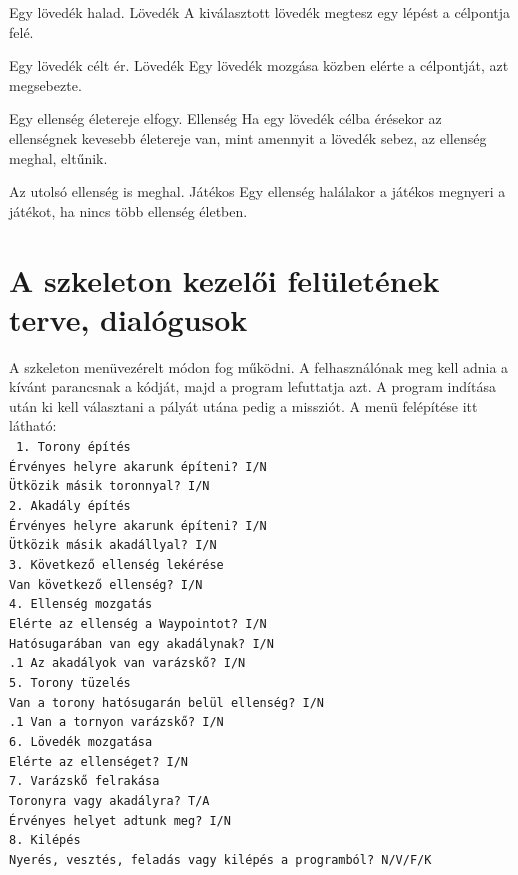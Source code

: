 {Egy lövedék halad.}
{Lövedék}
{A kiválasztott lövedék megtesz egy lépést a célpontja felé.}

{Egy lövedék célt ér.}
{Lövedék}
{Egy lövedék mozgása közben elérte a célpontját, azt megsebezte.}

{Egy ellenség életereje elfogy.}
{Ellenség}
{Ha egy lövedék célba érésekor az ellenségnek kevesebb életereje van, mint amennyit a lövedék sebez, az ellenség meghal, eltűnik.}

{Az utolsó ellenség is meghal.}
{Játékos}
{Egy ellenség halálakor a játékos megnyeri a játékot, ha nincs több ellenség életben.}

\pagebreak
\setlength\parindent{15mm}
\section{A szkeleton kezelői felületének terve, dialógusok}
A szkeleton menüvezérelt módon fog működni. A felhasználónak meg kell adnia a kívánt parancsnak a kódját, majd a program lefuttatja azt. A program indítása után ki kell választani a pályát utána pedig a missziót. A menü felépítése itt látható: \\
\begingroup 
\fontsize{10pt}{10pt}\selectfont
\texttt{
1. Torony építés \\
 Érvényes helyre akarunk építeni? I/N \\
 Ütközik másik toronnyal? I/N \\
2. Akadály építés \\
 Érvényes helyre akarunk építeni? I/N \\
 Ütközik másik akadállyal? I/N \\
3. Következő ellenség lekérése \\
 Van következő ellenség? I/N \\
4. Ellenség mozgatás \\
 Elérte az ellenség a Waypointot? I/N \\
 Hatósugarában van egy akadálynak? I/N \\
\indent {}.1 Az akadályok van varázskő? I/N \\
5. Torony tüzelés \\
 Van a torony hatósugarán belül ellenség? I/N \\
\indent {}.1 Van a tornyon varázskő? I/N \\
6. Lövedék mozgatása \\
 Elérte az ellenséget? I/N \\
7. Varázskő felrakása \\
 Toronyra vagy akadályra? T/A \\
 Érvényes helyet adtunk meg? I/N \\
8. Kilépés \\
 Nyerés, vesztés, feladás vagy kilépés a programból? N/V/F/K \\
}
